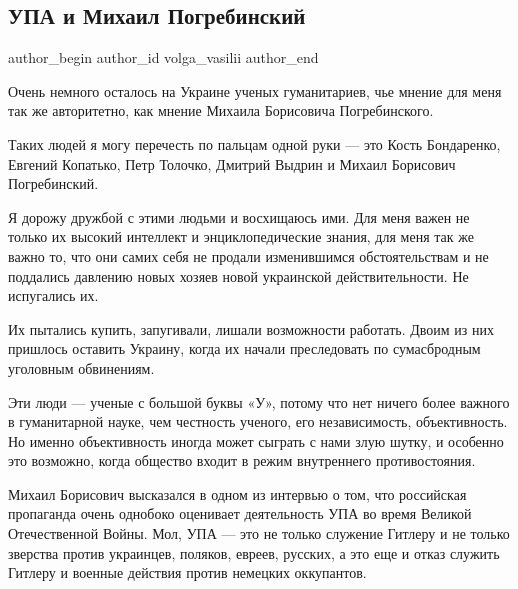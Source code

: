  
 
 
 
 
 
\subsection{УПА и Михаил Погребинский}
\label{sec:29_11_2020.fb.volga_vasilii.1.upa_mihail_pogrebinskii}
\ifcmt
	author_begin
   author_id volga_vasilii
	author_end
\fi

Очень немного осталось на Украине ученых гуманитариев, чье мнение для меня так
же авторитетно, как мнение Михаила Борисовича Погребинского. 

Таких людей я могу перечесть по пальцам одной руки --- это Кость Бондаренко,
Евгений Копатько, Петр Толочко, Дмитрий Выдрин и Михаил Борисович Погребинский. 

Я дорожу дружбой с этими людьми и восхищаюсь ими. Для меня важен не только их
высокий интеллект и энциклопедические знания, для меня так же важно то, что они
самих себя не продали изменившимся обстоятельствам и не поддались давлению
новых хозяев новой украинской действительности. Не испугались их.

Их пытались купить, запугивали, лишали возможности работать. Двоим из них
пришлось оставить Украину, когда их начали преследовать по сумасбродным
уголовным обвинениям. 

Эти люди --- ученые с большой буквы «У», потому что нет ничего более важного в
гуманитарной науке, чем честность ученого, его независимость, объективность.
Но именно объективность иногда может сыграть с нами злую шутку, и особенно это
возможно, когда общество входит в режим внутреннего противостояния. 

Михаил Борисович высказался в одном из интервью о том, что российская
пропаганда очень однобоко оценивает деятельность УПА во время Великой
Отечественной Войны. Мол, УПА --- это не только служение Гитлеру и не только
зверства против украинцев, поляков, евреев, русских, а это еще и отказ служить
Гитлеру и военные действия против немецких оккупантов. 


